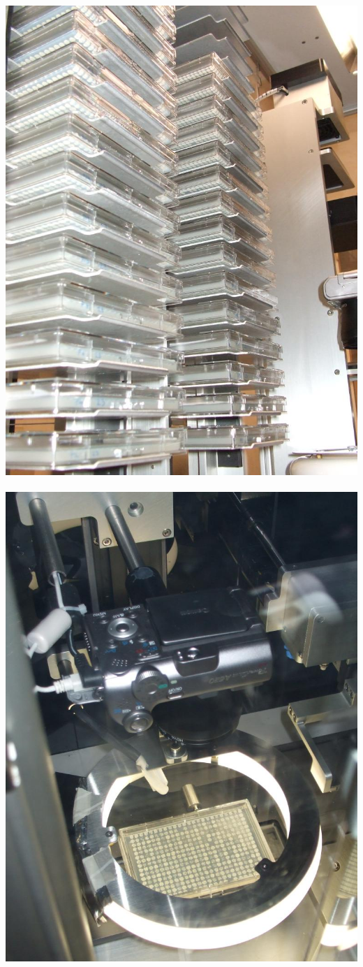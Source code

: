 \documentclass[mathserif,handout]{beamer}
\begin{document}
{{\includegraphics[height=0.4\textheight]{figs/robots-plates-sticky}~
\includegraphics[height=0.4\textheight]{figs/robots-plate-photo}
}
}
\end{document}
